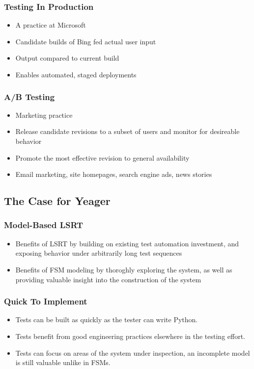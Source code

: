 \begin{frame}
  \frametitle{Testing In Production}
  \begin{itemize}
    \item A practice at Microsoft
    \item Candidate builds of Bing fed actual user input
    \item Output compared to current build
    \item Enables automated, staged deployments
  \end{itemize}
\end{frame}

\begin{frame}
  \frametitle{A/B Testing}
  \begin{itemize}
    \item Marketing practice
    \item Release candidate revisions to a subset of users and monitor for desireable behavior
    \item Promote the most effective revision to general availability
    \item Email marketing, site homepages, search engine ads, news stories
  \end{itemize}
  \citep{HBR2017ABTest}
\end{frame}

\subsection{The Case for Yeager}

\begin{frame}
  \frametitle{Model-Based LSRT}
  \begin{itemize}
    \item Benefits of LSRT by building on existing test automation investment, and exposing behavior under arbitrarily long test sequences
    \item Benefits of FSM modeling by thoroghly exploring the system, as well as providing valuable insight into the construction of the system
  \end{itemize}
\end{frame}

\begin{frame}
  \frametitle{Quick To Implement}
  \begin{itemize}
    \item Tests can be built as quickly as the tester can write Python.
    \item Tests benefit from good engineering practices elsewhere in the testing effort.
    \item Tests can focus on areas of the system under inspection, an incomplete model is still valuable unlike in FSMs.
  \end{itemize}
\end{frame}

